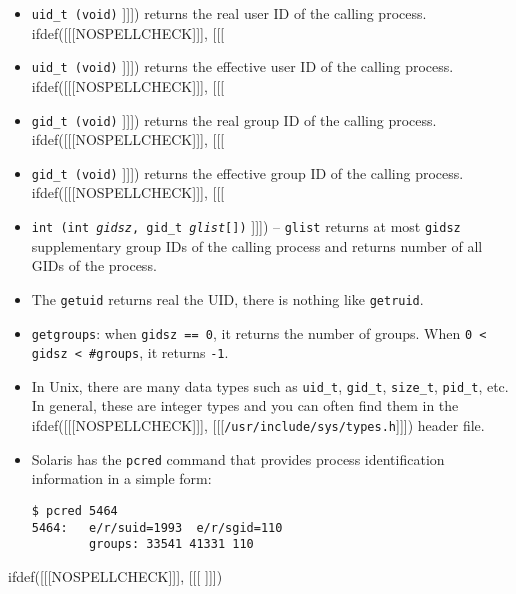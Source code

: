 \begin{slide}
\begin{itemize}
ifdef([[[NOSPELLCHECK]]], [[[
\item \texttt{uid\_t (void)}
]]])
returns the real user ID of the calling process.
ifdef([[[NOSPELLCHECK]]], [[[
\item \texttt{uid\_t (void)}
]]])
returns the effective user ID of the calling process.
ifdef([[[NOSPELLCHECK]]], [[[
\item \texttt{gid\_t (void)}
]]])
returns the real group ID of the calling process.
ifdef([[[NOSPELLCHECK]]], [[[
\item \texttt{gid\_t (void)}
]]])
returns the effective group ID of the calling process.
ifdef([[[NOSPELLCHECK]]], [[[
\item \texttt{int (int \emph{gidsz}, gid\_t \emph{glist}[])}
]]])
-- \texttt{glist} returns at most \texttt{gidsz} supplementary group
IDs of the calling process and returns number of all GIDs of the process.
\end{itemize}
\end{slide}

\begin{itemize}
\item The \texttt{getuid} returns real the UID, there is nothing like
\texttt{getruid}.
\item \texttt{getgroups}: when \texttt{gidsz~==~0}, it returns the number of
groups. When \texttt{0 < gidsz < \#groups}, it returns \texttt{-1}.
\item In Unix, there are many data types such as \verb#uid_t#, \verb#gid_t#,
\verb#size_t#, \verb#pid_t#, etc.  In general, these are integer types and you
can often find them in the
ifdef([[[NOSPELLCHECK]]], [[[\texttt{/usr/inc{}lude/sys/types.h}]]]) header
file.
\item Solaris has the \texttt{pcred} command that provides process
identification information in a simple form:

\begin{verbatim}
$ pcred 5464
5464:   e/r/suid=1993  e/r/sgid=110
        groups: 33541 41331 110
\end{verbatim}
\end{itemize}


ifdef([[[NOSPELLCHECK]]], [[[
]]])

